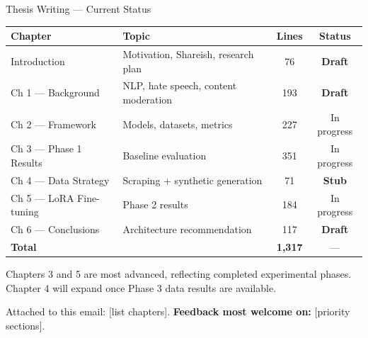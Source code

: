 \documentclass[aspectratio=169, 12pt]{beamer}
\newcommand{\bad}[1]{\textcolor{warnred}{\textbf{#1}}}
\newcommand{\warn}[1]{\textcolor{warnorange}{\textbf{#1}}}
\begin{document}
\begin{frame}[shrink=20]{Thesis Writing --- Current Status}
  \small
  \begin{tabular}{llcc}
    \toprule
    \textbf{Chapter} & \textbf{Topic} & \textbf{Lines} & \textbf{Status} \\
    \midrule
    Introduction & Motivation, Shareish, research plan & 76 & \warn{Draft} \\
    Ch 1 --- Background & NLP, hate speech, content moderation & 193 & \warn{Draft} \\
    Ch 2 --- Framework & Models, datasets, metrics & 227 & In progress \\
    Ch 3 --- Phase 1 Results & Baseline evaluation & 351 & In progress \\
    \cellcolor{warnred!15}Ch 4 --- Data Strategy & \cellcolor{warnred!15}Scraping + synthetic generation & \cellcolor{warnred!15}71 & \cellcolor{warnred!15}\bad{Stub} \\
    Ch 5 --- LoRA Fine-tuning & Phase 2 results & 184 & In progress \\
    Ch 6 --- Conclusions & Architecture recommendation & 117 & \warn{Draft} \\
    \midrule
    \rowcolor{lightgray}
    \textbf{Total} & & \textbf{1,317} & --- \\
    \bottomrule
  \end{tabular}

  \vspace{4pt}
  \small
  Chapters 3 and 5 are most advanced, reflecting completed experimental phases.
  Chapter 4 will expand once Phase 3 data results are available.

  \vspace{4pt}
  \begin{alertblock}{}
    Attached to this email: [list chapters].
    \textbf{Feedback most welcome on:} [priority sections].
  \end{alertblock}
\end{frame}
\end{document}
